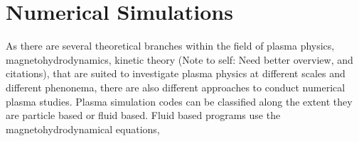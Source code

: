 
\section{Numerical Simulations}
	As there are several theoretical branches within the field of plasma physics,
	magnetohydrodynamics, kinetic theory (Note to self:  Need better overview, and citations),
	that are suited to investigate plasma physics at different scales and different phenonema,
	there are also different approaches to conduct numerical plasma studies.
	Plasma simulation codes can be classified along the extent they are particle based
	or fluid based. Fluid based programs use the magnetohydrodynamical equations,



